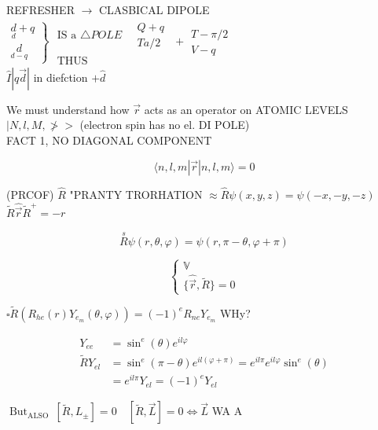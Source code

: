 \documentclass[10pt]{article}
\begin{document}
REFRESHER $\rightarrow$ CLASBICAL DIPOLE\\
$\left.\begin{array}{l}\underset{d}{d}+q \\ \underset{d-q}{d}\end{array}\right\} \begin{gathered}\text { IS a } \triangle P O L E \quad \begin{array}{l}Q+q \\ T a / 2\end{array} \\ \text { THUS }\end{gathered}+\begin{gathered}T-\pi / 2 \\ V-q\end{gathered}$\\
$\hat{I}|q \vec{d}|$ in diefction $+\hat{d}$

We must understand how $\vec{r}$ acts as an operator on ATOMIC LEVELS $\mid N, l, M, \ngtr>$ (electron spin has no el. DI POLE)\\
FACT 1, NO DIAGONAL COMPONENT

$$
\langle n, l, m| \vec{r}|n, l, m\rangle=0
$$

(PRCOF) $\hat{R}$ "PRANTY TRORHATION $\approx \hat{R} \psi(x, y, z)=\psi(-x,-y,-z)$\\
$\tilde{R} \hat{\vec{r}} \tilde{R}^{+}=-r$

$$
\stackrel{s}{R} \psi(r, \theta, \varphi)=\psi(r, \pi-\theta, \varphi+\pi)
$$

$$
\left\{\begin{array}{c}
\mathbb{V} \\
\{\hat{\vec{r}}, \tilde{R}\}=0
\end{array}\right.
$$

$\square \tilde{R}\left(R_{h e}(r) Y_{e_{m}}(\theta, \varphi)\right)=(-1)^{e} R_{n e} Y_{e_{m}}$ WHy?

$$
\begin{aligned}
Y_{e e} & =\sin ^{e}(\theta) e^{i l \varphi} \\
\tilde{R} Y_{e l} & =\sin ^{e}(\pi-\theta) e^{i l(\varphi+\pi)}=e^{i l \pi} e^{i l \varphi} \sin ^{e}(\theta) \\
& =e^{i l \pi} Y_{e l}=(-1)^{e} Y_{e l}
\end{aligned}
$$

$\operatorname{But}_{\text {ALSO }}\left[\tilde{R}, L_{ \pm}\right]=0 \quad[\tilde{R}, \vec{L}]=0 \Leftrightarrow \vec{L}$ WA A
\end{document}
